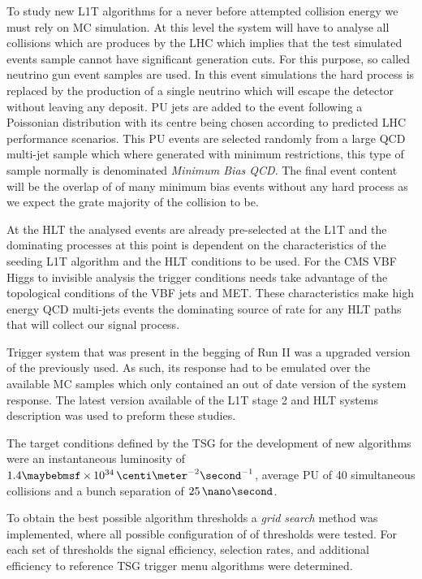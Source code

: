 To study new \gls{L1T} algorithms for a never before attempted collision energy we must rely on \gls{MC} simulation. At this level the system will have to analyse all collisions which are produces by the \gls{LHC} which implies that the test simulated events sample cannot have significant generation cuts. For this purpose, so called neutrino gun event samples are used. In this event simulations the hard process is replaced by the production of a single neutrino which will escape the detector without leaving any deposit. \acrfull{PU} jets are added to the event following a Poissonian distribution with its centre being chosen according to predicted \gls{LHC} performance scenarios. This \gls{PU} events are selected randomly from a large \gls{QCD} multi-jet sample which where generated with minimum restrictions, this type of sample normally is denominated \textit{Minimum Bias QCD}. The final event content will be the overlap of of many minimum bias events without any hard process as we expect the grate majority of the collision to be.

At the \gls{HLT} the analysed events are already pre-selected at the \gls{L1T} and the dominating processes at this point is dependent on the characteristics of the seeding \gls{L1T} algorithm and the \gls{HLT} conditions to be used. For the \gls{CMS} \gls{VBF} Higgs to invisible analysis the trigger conditions needs take advantage of the topological conditions of the \gls{VBF} jets and \gls{MET}. These characteristics make high energy \gls{QCD} multi-jets events the dominating source of rate for any \gls{HLT} paths that will collect our signal process.

Trigger system that was present in the begging of Run II was a upgraded version of the previously used. As such, its response had to be emulated over the available \gls{MC} samples which only contained an out of date version of the system response. The latest version available of the \gls{L1T} stage 2 and \gls{HLT} systems description was used to preform these studies.

The target conditions defined by the \gls{TSG} for the development of new algorithms were an instantaneous luminosity of  $1.4 \times 10^{34}\,\centi\meter^{-2}\second^{-1}$, average \gls{PU} of 40 simultaneous collisions and a bunch separation of $25\,\nano\second$.

To obtain the best possible algorithm thresholds a \textit{grid search} method was implemented, where all possible configuration of of thresholds were tested. For each set of thresholds the signal efficiency, selection rates, and additional efficiency to reference \gls{TSG} trigger menu algorithms were determined. 

